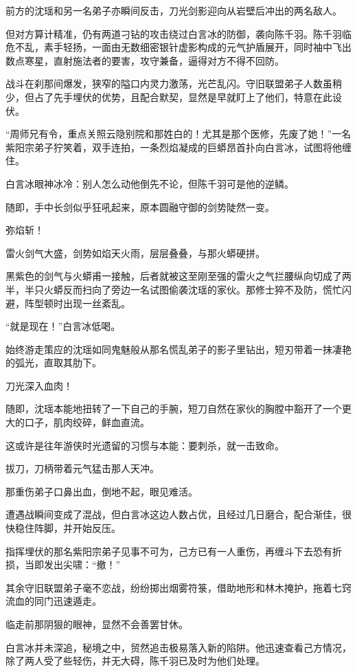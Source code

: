 前方的沈瑶和另一名弟子亦瞬间反击，刀光剑影迎向从岩壁后冲出的两名敌人。

但对方算计精准，仍有两道刁钻的攻击绕过白言冰的防御，袭向陈千羽。陈千羽临危不乱，素手轻扬，一面由无数细密银针虚影构成的元气护盾展开，同时袖中飞出数点寒星，直射施法者的要害，攻守兼备，逼得对方不得不回防。

战斗在刹那间爆发，狭窄的隘口内灵力激荡，光芒乱闪。守旧联盟弟子人数虽稍少，但占了先手埋伏的优势，且配合默契，显然是早就盯上了他们，特意在此设伏。

“周师兄有令，重点关照云隐别院和那姓白的！尤其是那个医修，先废了她！”一名紫阳宗弟子狞笑着，双手连拍，一条烈焰凝成的巨蟒昂首扑向白言冰，试图将他缠住。

白言冰眼神冰冷：别人怎么动他倒先不论，但陈千羽可是他的逆鳞。

随即，手中长剑似乎狂吼起来，原本圆融守御的剑势陡然一变。

弥焰斩！

雷火剑气大盛，剑势如焰天火雨，层层叠叠，与那火蟒硬拼。

黑紫色的剑气与火蟒甫一接触，后者就被这至刚至强的雷火之气拦腰纵向切成了两半，半只火蟒反而扫向了旁边一名试图偷袭沈瑶的家伙。那修士猝不及防，慌忙闪避，阵型顿时出现一丝紊乱。

“就是现在！”白言冰低喝。

始终游走策应的沈瑶如同鬼魅般从那名慌乱弟子的影子里钻出，短刃带着一抹凄艳的弧光，直取其肋下。

刀光深入血肉！

随即，沈瑶本能地扭转了一下自己的手腕，短刀自然在家伙的胸膛中豁开了一个更大的口子，肌肉绞碎，鲜血直流。

这或许是往年游侠时光遗留的习惯与本能：要刺杀，就一击致命。

拔刀，刀柄带着元气猛击那人天冲。

那重伤弟子口鼻出血，倒地不起，眼见难活。

遭遇战瞬间变成了混战，但白言冰这边人数占优，且经过几日磨合，配合渐佳，很快稳住阵脚，并开始反压。

指挥埋伏的那名紫阳宗弟子见事不可为，己方已有一人重伤，再缠斗下去恐有折损，当即发出尖啸：“撤！”

其余守旧联盟弟子毫不恋战，纷纷掷出烟雾符箓，借助地形和林木掩护，拖着七窍流血的同门迅速遁走。

临走前那阴狠的眼神，显然不会善罢甘休。

白言冰并未深追，秘境之中，贸然追击极易落入新的陷阱。他迅速查看己方情况，除了两人受了些轻伤，并无大碍，陈千羽已及时为他们处理。

